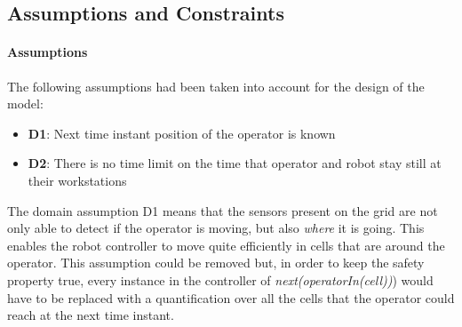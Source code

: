 \subsection{Assumptions and Constraints}

\paragraph{Assumptions}
\newcommand{\DI}{\textbf{D1}: Next time instant position of the operator is known}
\newcommand{\DII}{\textbf{D2}: There is no time limit on the time that operator and robot stay still at their workstations}
\newcommand{\DIII}{\textbf{D3}: }
\newcommand{\DIV}{\textbf{D4}: }
\newcommand{\DV}{\textbf{D5}: }
\newcommand{\DVI}{\textbf{D6}: }
\newcommand{\DVII}{\textbf{D7}: }
\newcommand{\DVIII}{\textbf{D8}: }
\newcommand{\DIX}{\textbf{D9}: }
\newcommand{\DX}{\textbf{D10}: }
\newcommand{\DXI}{\textbf{D11}: }

The following assumptions had been taken into account for the design of the model:
\newline\begin{itemize}
	\item  \DI
	\item  \DII
\end{itemize}

The domain assumption D1 means that the sensors present on the grid are not only able to detect if the operator is moving, but also \textit{where} it is going. This enables the robot controller to move quite efficiently in cells that are around the operator. This assumption could be removed but, in order to keep the safety property true, every instance in the controller of \textit{next(operatorIn(cell))}) would have to be replaced with a quantification over all the cells that the operator could reach at the next time instant.
\newpage

